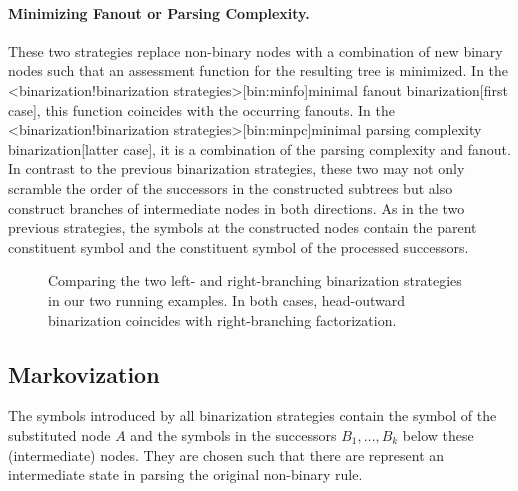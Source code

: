 \documentclass[../../document.tex]{subfiles}
\begin{document}
    \paragraph{Minimizing Fanout or Parsing Complexity.}
    These two strategies replace non-binary nodes with a combination of new binary nodes such that an assessment function for the resulting tree is minimized.
    In the <binarization!binarization strategies>[bin:minfo]{minimal fanout binarization}[first case], this function coincides with the occurring fanouts.
    In the <binarization!binarization strategies>[bin:minpc]{minimal parsing complexity binarization}[latter case], it is a combination of the parsing complexity and fanout.
    In contrast to the previous binarization strategies, these two may not only scramble the order of the successors in the constructed subtrees but also construct branches of intermediate nodes in both directions.
    As in the two previous strategies, the symbols at the constructed nodes contain the parent constituent symbol and the constituent symbol of the processed successors.

    \begin{figure}
        \resizebox{.3\linewidth}{!}{}\hfill
        \resizebox{.3\linewidth}{!}{}\hfill
        \resizebox{.3\linewidth}{!}{}

        \vspace{.5cm}

        \resizebox{.3\linewidth}{!}{}\hfill
        \resizebox{.3\linewidth}{!}{}\hfill
        \resizebox{.3\linewidth}{!}{}

        \caption{\label{fig:ex:binarization}
            Comparing the two left- and right-branching binarization strategies in our two running examples.
            In both cases, head-outward binarization coincides with right-branching factorization.
        }
    \end{figure}


    \subsection{Markovization}
    The symbols introduced by all binarization strategies contain the symbol of the substituted node \(A\) and the symbols in the successors \(B_1, \ldots, B_k\) below these (intermediate) nodes.
    They are chosen such that there are represent an intermediate state in parsing the original non-binary rule.
\end{document}

